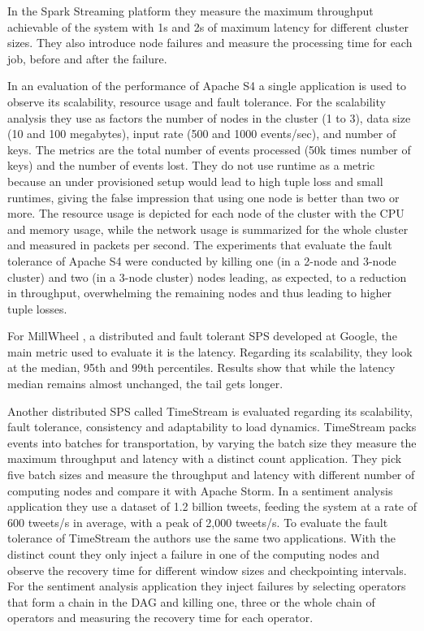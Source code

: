 \documentclass[ppgc,diss,english]{iiufrgs}
\begin{document}
In the Spark Streaming platform \cite{zaharia2012discretized} they measure the maximum throughput achievable of the system with 1s and 2s of maximum latency for different cluster sizes. They also introduce node failures and measure the processing time for each job, before and after the failure.

In an evaluation of the performance of Apache S4 \cite{chauhan2012performance} a single application is used to observe its scalability, resource usage and fault tolerance. For the scalability analysis they use as factors the number of nodes in the cluster (1 to 3), data size (10 and 100 megabytes), input rate (500 and 1000 events/sec), and number of keys. The metrics are the total number of events processed (50k times number of keys) and the number of events lost. They do not use runtime as a metric because an under provisioned setup would lead to high tuple loss and small runtimes, giving the false impression that using one node is better than two or more. The resource usage is depicted for each node of the cluster with the CPU and memory usage, while the network usage is summarized for the whole cluster and measured in packets per second. The experiments that evaluate the fault tolerance of Apache S4 were conducted by killing one (in a 2-node and 3-node cluster) and two (in a 3-node cluster) nodes leading, as expected, to a reduction in throughput, overwhelming the remaining nodes and thus leading to higher tuple losses.

For MillWheel \cite{akidau2013millwheel}, a distributed and fault tolerant SPS developed at Google, the main metric used to evaluate it is the latency. Regarding its scalability, they look at the median, 95th and 99th percentiles. Results show that while the latency median remains almost unchanged, the tail gets longer.

Another distributed SPS called TimeStream \cite{qian2013timestream} is evaluated regarding its scalability, fault tolerance, consistency and adaptability to load dynamics. TimeStream packs events into batches for transportation, by varying the batch size they measure the maximum throughput and latency with a distinct count application. They pick five batch sizes and measure the throughput and latency with different number of computing nodes and compare it with Apache Storm. In a sentiment analysis application they use a dataset of 1.2 billion tweets, feeding the system at a rate of 600 tweets/s in average, with a peak of 2,000 tweets/s. To evaluate the fault tolerance of TimeStream the authors use the same two applications. With the distinct count they only inject a failure in one of the computing nodes and observe the recovery time for different window sizes and checkpointing intervals. For the sentiment analysis application they inject failures by selecting operators that form a chain in the DAG and killing one, three or the whole chain of operators and measuring the recovery time for each operator.
\end{document}
